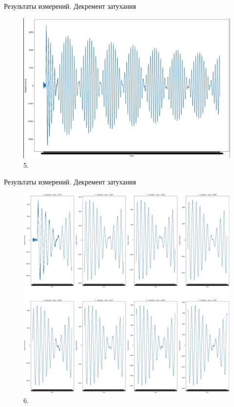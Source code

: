 \documentclass[xcolor=table]{beamer}
\begin{document}
\begin{frame}{Результаты измерений. Декремент затухания}
    \begin{figure}[h]
        \centering
        \includegraphics[scale = 0.25]{Oscillation.jpg}
        \caption{5. }
        \label{}
    \end{figure}
\end{frame}


\begin{frame}{Результаты измерений. Декремент затухания}
    \begin{figure}[h]
        \centering
        \includegraphics[scale = 0.12]{Oscillation_groups.jpg}
        \caption{6. }
        \label{}
    \end{figure}
\end{frame}
\end{document}
